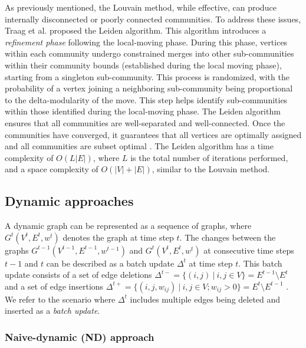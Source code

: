 As previously mentioned, the Louvain method, while effective, can produce internally disconnected or poorly connected communities. To address these issues, Traag et al. \cite{com-traag19} proposed the Leiden algorithm. This algorithm introduces a \textit{refinement phase} following the local-moving phase. During this phase, vertices within each community undergo constrained merges into other sub-communities within their community bounds (established during the local moving phase), starting from a singleton sub-community. This process is randomized, with the probability of a vertex joining a neighboring sub-community being proportional to the delta-modularity of the move. This step helps identify sub-communities within those identified during the local-moving phase. The Leiden algorithm ensures that all communities are well-separated and well-connected. Once the communities have converged, it guarantees that all vertices are optimally assigned and all communities are subset optimal \cite{com-traag19}. The Leiden algorithm has a time complexity of $O(L|E|)$, where $L$ is the total number of iterations performed, and a space complexity of $O(|V| + |E|)$, similar to the Louvain method.




\subsection{Dynamic approaches}
\label{sec:dynamic-graphs}

A dynamic graph can be represented as a sequence of graphs, where $G^t(V^t, E^t, w^t)$ denotes the graph at time step $t$. The changes between the graphs $G^{t-1}(V^{t-1}, E^{t-1}, w^{t-1})$ and $G^t(V^t, E^t, w^t)$ at consecutive time steps $t-1$ and $t$ can be described as a batch update $\Delta^t$ at time step $t$. This batch update consists of a set of edge deletions $\Delta^{t-} = \{(i, j)\ |\ i, j \in V\} = E^{t-1} \setminus E^t$ and a set of edge insertions $\Delta^{t+} = \{(i, j, w_{ij})\ |\ i, j \in V; w_{ij} > 0\} = E^t \setminus E^{t-1}$ \cite{com-zarayeneh21}. We refer to the scenario where $\Delta^t$ includes multiple edges being deleted and inserted as a \textit{batch update}.


\subsubsection{Naive-dynamic (ND) approach \cite{com-aynaud10, com-chong13, com-shang14, com-zhuang19}}
\label{sec:naive-dynamic}

